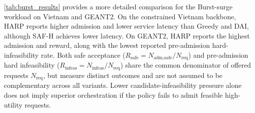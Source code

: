 \documentclass[final,5p]{elsarticle}
\newcommand{\rev}[1]{\textcolor{BrickRed}{#1}}
\begin{document}
\autoref{tab:burst_results} provides a more detailed comparison for the Burst-surge workload on Vietnam and GEANT2. On the constrained Vietnam backbone, HARP reports higher admission and \rev{lower service latency than Greedy and DAI, although SAF-H achieves lower latency}. On GEANT2, HARP reports the highest admission and reward, \rev{along with the lowest reported pre-admission hard-infeasibility rate}. \rev{Both safe acceptance ($R_{\text{safe}} = N_{\text{adm,safe}}/N_{\text{req}}$) and pre-admission hard infeasibility ($R_{\text{infeas}} = N_{\text{infeas}}/N_{\text{req}}$) share the common denominator of offered requests $N_{\text{req}}$, but measure distinct outcomes and are not assumed to be complementary across all variants. Lower candidate-infeasibility pressure alone does not imply superior orchestration if the policy fails to admit feasible high-utility requests.}

\begin{table}[!tb]
\centering
\caption{\rev{Burst-surge simulation results on the Vietnam backbone and GEANT2 topologies (mean across $N=20$ matched simulation runs; one decimal place). Pre-admission infeasibility is the percentage of offered requests whose selected candidate fails a hard check, as defined in the accompanying text; it is not the percentage of all candidate actions enumerated. The table reports no SD for these rounded summaries.}}
\label{tab:burst_results}
\renewcommand{\arraystretch}{1.10}
\small
{}
\end{table}
\end{document}
